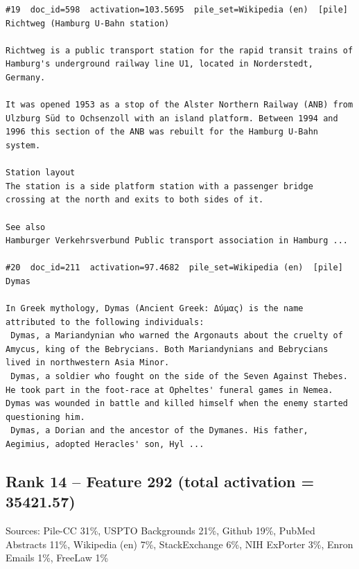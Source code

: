 \begin{verbatim}
#19  doc_id=598  activation=103.5695  pile_set=Wikipedia (en)  [pile]
Richtweg (Hamburg U-Bahn station)

Richtweg is a public transport station for the rapid transit trains of Hamburg's underground railway line U1, located in Norderstedt, Germany.

It was opened 1953 as a stop of the Alster Northern Railway (ANB) from Ulzburg Süd to Ochsenzoll with an island platform. Between 1994 and 1996 this section of the ANB was rebuilt for the Hamburg U-Bahn system.

Station layout 
The station is a side platform station with a passenger bridge crossing at the north and exits to both sides of it.

See also 
Hamburger Verkehrsverbund Public transport association in Hamburg ...

#20  doc_id=211  activation=97.4682  pile_set=Wikipedia (en)  [pile]
Dymas

In Greek mythology, Dymas (Ancient Greek: Δύμας) is the name attributed to the following individuals:
 Dymas, a Mariandynian who warned the Argonauts about the cruelty of Amycus, king of the Bebrycians. Both Mariandynians and Bebrycians lived in northwestern Asia Minor.
 Dymas, a soldier who fought on the side of the Seven Against Thebes. He took part in the foot-race at Opheltes' funeral games in Nemea. Dymas was wounded in battle and killed himself when the enemy started questioning him.
 Dymas, a Dorian and the ancestor of the Dymanes. His father, Aegimius, adopted Heracles' son, Hyl ...

\end{verbatim}

\subsection*{Rank 14 -- Feature 292 (total activation = 35421.57)}

Sources: Pile-CC 31\%, USPTO Backgrounds 21\%, Github 19\%, PubMed Abstracts 11\%, Wikipedia (en) 7\%, StackExchange 6\%, NIH ExPorter 3\%, Enron Emails 1\%, FreeLaw 1\%

